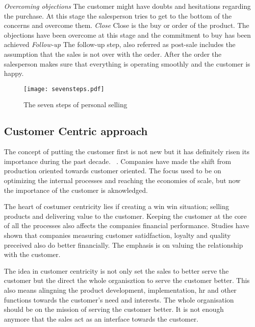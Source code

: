 \documentclass[12pt,a4paper,oneside,pdftex]{report}
\begin{document}
\emph{Overcoming objections}\newline
The customer might have doubts and hesitations regarding the purchase. At this stage the salesperson tries to get to the bottom of the concerns and overcome them. \citep{Moncrief}\newline \newline
\emph{Close}\newline
Close is the buy or order of the product. The objections have been overcome at this stage and the commitment to buy has been achieved \citep{Moncrief} \newline \newline
\emph{Follow-up}\newline
The follow-up step, also referred as post-sale includes the assumption that the sales is not over with the order. After the order the salesperson makes sure that everything is operating smoothly and the customer is happy. \citep{Dubinsky}
\newline 
\begin{figure}[ht]
  \begin{center}
    \texttt{[image: sevensteps.pdf]}
    \caption{The seven steps of personal selling}
    \label{fig:seven}
  \end{center}
\end{figure}
\subsection{Customer Centric approach}

The concept of putting the customer first is not new but it has definitely risen its importance during the past decade.  ~\citep{Shah}. Companies have made the shift from production oriented towards customer oriented. The focus used to be on optimizing the internal processes and reaching the economies of scale, but now the importance of the customer is aknowledged. 

The heart of costumer centricity lies if creating a win win situation; selling products and delivering value to the customer. \citep{Shah} Keeping the customer at the core of all the processes also affects the companies financial performance. Studies have shown that companies measuring customer satidfaction, loyalty and quality preceived also do better financially. The emphasis is on valuing the relationship with the customer. 

The idea in customer centricity is not only set the sales to better serve the customer but the direct the whole organisztion to serve the customer better. This also means alingning the product development, implementation, hr and other functions towards the customer's need and interests. The whole organisation should be on the mission of serving the customer better. It is not enough anymore that the sales act as an interface towards the customer. 
\newline
\end{document}
